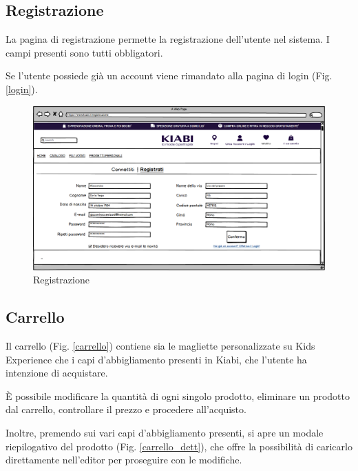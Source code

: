 \documentclass[12pt,italian,]{report}
\begin{document}
\subsection{Registrazione} 

La pagina di registrazione permette la registrazione dell'utente nel sistema. I campi presenti sono tutti obbligatori.

Se l'utente possiede già un account viene rimandato alla pagina di login (Fig. \ref{login}).

\begin{figure}[h]
\centering
\includegraphics{balsamiq/Registrazione.png}
\caption{Registrazione}
\label{registrazione}
\end{figure}
\clearpage 





\newpage
\subsection{Carrello} 

Il carrello (Fig. \ref{carrello}) contiene sia le magliette personalizzate su Kids Experience che i capi d'abbigliamento presenti in Kiabi, che l'utente ha intenzione di acquistare. 

È possibile modificare la quantità di ogni singolo prodotto, eliminare un prodotto dal carrello, controllare il prezzo e procedere all'acquisto.

Inoltre, premendo sui vari capi d'abbigliamento presenti, si apre un modale riepilogativo del prodotto (Fig. \ref{carrello_dett}), che offre la possibilità di caricarlo direttamente nell'editor per proseguire con le modifiche. 
\end{document}
